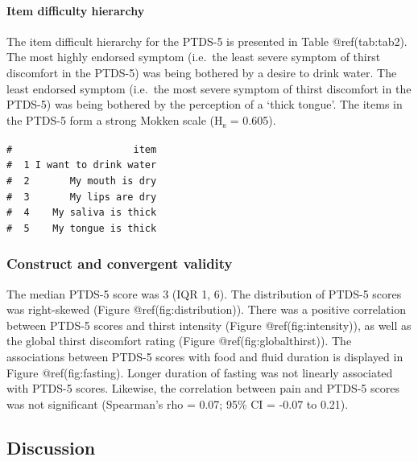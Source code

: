 \documentclass[letterpaper,9pt,twocolumn,twoside,]{pinp}
\begin{document}
\hypertarget{item-difficulty-hierarchy}{%
\paragraph{Item difficulty hierarchy}\label{item-difficulty-hierarchy}}

The item difficult hierarchy for the PTDS-5 is presented in Table
@ref(tab:tab2). The most highly endorsed symptom (i.e.~the least severe
symptom of thirst discomfort in the PTDS-5) was being bothered by a
desire to drink water. The least endorsed symptom (i.e.~the most severe
symptom of thirst discomfort in the PTDS-5) was being bothered by the
perception of a `thick tongue'. The items in the PTDS-5 form a strong
Mokken scale (H\textsubscript{s} = 0.605).

\begin{ShadedResult}
\begin{verbatim}
#                     item
#  1 I want to drink water
#  2       My mouth is dry
#  3       My lips are dry
#  4    My saliva is thick
#  5    My tongue is thick
\end{verbatim}
\end{ShadedResult}

\hypertarget{construct-and-convergent-validity}{%
\subsubsection{Construct and convergent
validity}\label{construct-and-convergent-validity}}

The median PTDS-5 score was 3 (IQR 1, 6). The distribution of PTDS-5
scores was right-skewed (Figure @ref(fig:distribution)). There was a
positive correlation between PTDS-5 scores and thirst intensity (Figure
@ref(fig:intensity)), as well as the global thirst discomfort rating
(Figure @ref(fig:globalthirst)). The associations between PTDS-5 scores
with food and fluid duration is displayed in Figure @ref(fig:fasting).
Longer duration of fasting was not linearly associated with PTDS-5
scores. Likewise, the correlation between pain and PTDS-5 scores was not
significant (Spearman's rho = 0.07; 95\% CI = -0.07 to 0.21).

\hypertarget{discussion}{%
\subsection{Discussion}\label{discussion}}
\end{document}
